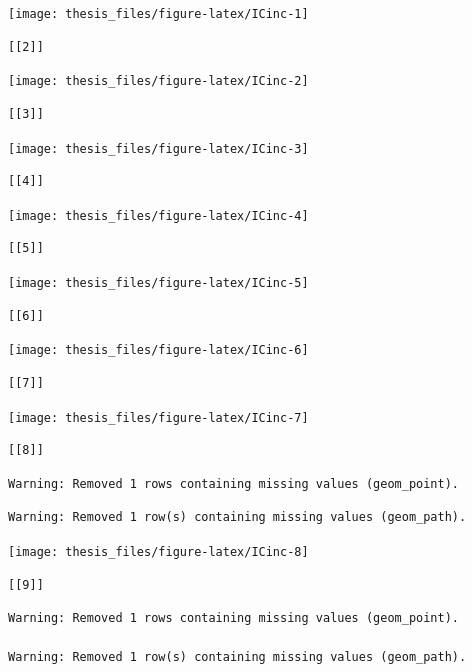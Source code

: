 \documentclass[a4paper,11pt]{article}
\begin{document}
\begin{center}\texttt{[image: thesis\_files/figure-latex/ICinc-1]} \end{center}
\begin{verbatim}
[[2]]
\end{verbatim}
\begin{center}\texttt{[image: thesis\_files/figure-latex/ICinc-2]} \end{center}
\begin{verbatim}
[[3]]
\end{verbatim}
\begin{center}\texttt{[image: thesis\_files/figure-latex/ICinc-3]} \end{center}
\begin{verbatim}
[[4]]
\end{verbatim}
\begin{center}\texttt{[image: thesis\_files/figure-latex/ICinc-4]} \end{center}
\begin{verbatim}
[[5]]
\end{verbatim}
\begin{center}\texttt{[image: thesis\_files/figure-latex/ICinc-5]} \end{center}
\begin{verbatim}
[[6]]
\end{verbatim}
\begin{center}\texttt{[image: thesis\_files/figure-latex/ICinc-6]} \end{center}
\begin{verbatim}
[[7]]
\end{verbatim}
\begin{center}\texttt{[image: thesis\_files/figure-latex/ICinc-7]} \end{center}
\begin{verbatim}
[[8]]
\end{verbatim}
\begin{verbatim}
Warning: Removed 1 rows containing missing values (geom_point).
\end{verbatim}
\begin{verbatim}
Warning: Removed 1 row(s) containing missing values (geom_path).
\end{verbatim}
\begin{center}\texttt{[image: thesis\_files/figure-latex/ICinc-8]} \end{center}
\begin{verbatim}
[[9]]
\end{verbatim}
\begin{verbatim}
Warning: Removed 1 rows containing missing values (geom_point).

Warning: Removed 1 row(s) containing missing values (geom_path).
\end{verbatim}
\end{document}
